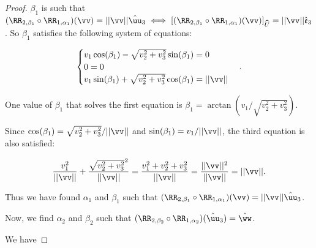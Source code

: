 \begin{proof}
    $\beta_1$ is such that $(\RR_{2, \beta_1} \circ \RR_{1, \alpha_1})(\vv) = ||\vv||\huu_3 \iff [(\RR_{2, \beta_1} \circ \RR_{1, \alpha_1})(\vv)]_{\hU} = ||\vv||\see_3$. So $\beta_1$ satisfies the following system of equations:

    \begin{align*}
        \begin{cases}
            v_1 \cos(\beta_1) - \sqrt{v_2^2 + v_3^2} \sin(\beta_1) = 0 \\
            0 = 0 \\
            v_1 \sin(\beta_1) + \sqrt{v_2^2 + v_3^2} \cos(\beta_1) = ||\vv||
        \end{cases}.
    \end{align*}

    One value of $\beta_1$ that solves the first equation is $\beta_1 = \arctan(v_1/ \sqrt{v_2^2 + v_3^2})$. 
    
    Since $\cos(\beta_1) = \sqrt{v_2^2 + v_3^2}/||\vv||$ and $\sin(\beta_1) = v_1/||\vv||$, the third equation is also satisfied:

    \begin{align*}
        \frac{v_1^2}{||\vv||} + \frac{\sqrt{v_2^2 + v_3^2}^2}{||\vv||} = \frac{v_1^2 + v_2^2 + v_3^2}{||\vv||} = \frac{||\vv||^2}{||\vv||} = ||\vv||.
    \end{align*}

    Thus we have found $\alpha_1$ and $\beta_1$ such that $(\RR_{2, \beta_1} \circ \RR_{1, \alpha_1})(\vv) = ||\vv||\huu_3$.

    \vspace{.5cm}

    Now, we find $\alpha_2$ and $\beta_2$ such that $(\RR_{2, \beta_2} \circ \RR_{1, \alpha_2})(\huu_3) = \hww$.
    
    We have


\end{proof}
